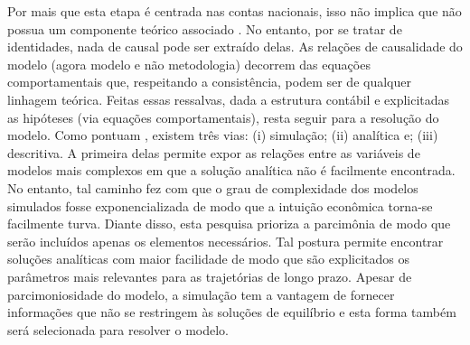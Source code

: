 Por mais que esta etapa é centrada nas contas nacionais, isso não implica que não possua um componente teórico associado \cite[p.~15--16]{macedo_e_silva_peering_2011}.  No entanto, por se tratar de identidades, nada de causal pode ser extraído delas. As relações de causalidade do modelo (agora modelo e não metodologia) decorrem das equações comportamentais que, respeitando a consistência, podem ser de qualquer linhagem teórica. Feitas essas ressalvas, dada a estrutura contábil e explicitadas as hipóteses (via equações comportamentais), resta seguir para a resolução do modelo. Como pontuam \textcite{caverzasi_stock-flow_2013}, existem três vias: (i) simulação; (ii) analítica e; (iii) descritiva. A primeira delas permite expor as relações entre as variáveis de modelos mais complexos em que a solução analítica não é facilmente encontrada. No entanto, tal caminho fez com que o grau de complexidade dos modelos simulados fosse exponencializada de modo que a intuição econômica torna-se facilmente turva.  
Diante disso, esta pesquisa prioriza a parcimônia de modo que serão incluídos apenas os elementos necessários.
Tal postura permite encontrar soluções analíticas com maior facilidade de modo que são explicitados os parâmetros mais relevantes para as
trajetórias de longo prazo. 
Apesar de parcimoniosidade do modelo, a simulação tem a vantagem de fornecer informações que não se restringem às soluções de equilíbrio e esta forma também será selecionada para resolver o modelo. 
